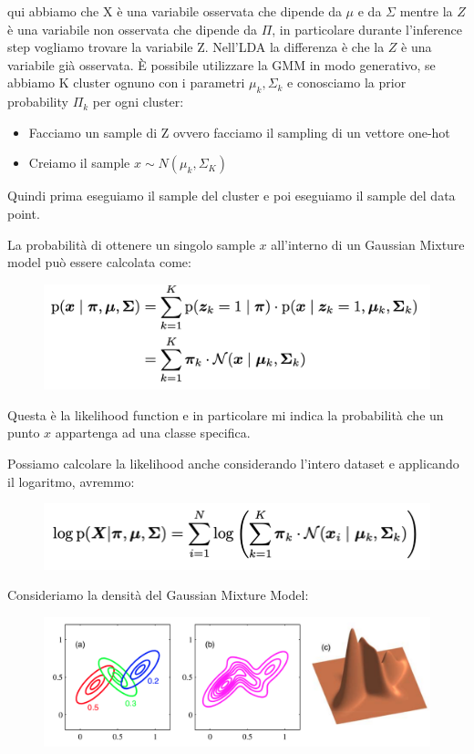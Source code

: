 \documentclass[14pt]{extreport}
\begin{document}
qui abbiamo che X è una variabile osservata che dipende da $\mu$ e da $\Sigma$ mentre la $Z$ è una variabile non osservata che dipende da $\Pi$, in
particolare durante l'inference step vogliamo trovare la variabile Z. Nell'LDA la differenza è che la $Z$ è una variabile già osservata. È possibile
utilizzare la GMM in modo generativo, se abbiamo K cluster ognuno con i parametri $\mu_k, \Sigma_k$ e conosciamo la prior probability $\Pi_k$ per ogni
cluster:

\begin{itemize}
	\item Facciamo un sample di Z ovvero facciamo il sampling di un vettore one-hot
	\item Creiamo il sample $x \sim N(\mu_k, \Sigma_K)$
\end{itemize}

Quindi prima eseguiamo il sample del cluster e poi eseguiamo il sample del data point.

La probabilità di ottenere un singolo sample $x$ all'interno di un Gaussian Mixture model può essere calcolata come:


\begin{figure}[H]
	\centering
	\includegraphics[width=0.7\linewidth]{540.jpeg}
\end{figure}

Questa è la likelihood function e in particolare mi indica la probabilità che un punto $x$ appartenga ad una classe specifica.

Possiamo calcolare la likelihood anche considerando l'intero dataset e applicando il logaritmo, avremmo:

\begin{figure}[H]
	\centering
	\includegraphics[width=0.7\linewidth]{541.jpeg}
\end{figure}

Consideriamo la densità del Gaussian Mixture Model:

\begin{figure}[H]
	\centering
	\includegraphics[width=0.7\linewidth]{542.jpeg}
\end{figure}
\end{document}
